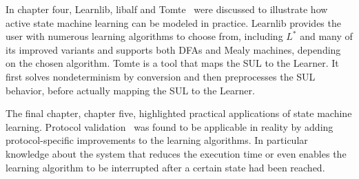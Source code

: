 \documentclass[multi,crop=false,class=article]{standalone}
\begin{document}
In chapter four, Learnlib, libalf and Tomte~\cite{Raffelt2009,Bollig2010,Tomte2014}
were discussed to illustrate how active state machine learning can be modeled in
practice. Learnlib provides the user with numerous learning algorithms to choose
from, including $L^*$ and many of its improved variants and supports both DFAs
and Mealy machines, depending on the chosen algorithm. Tomte is a tool that maps
the SUL to the Learner. It first solves nondeterminism by conversion and then
preprocesses the SUL behavior, before actually mapping the SUL to the Learner.


The final chapter, chapter
five, highlighted practical applications of state machine learning.
Protocol validation~\cite{deRuiter2015} was found to be applicable in reality by
adding protocol-specific improvements to the learning algorithms. In particular
knowledge about the system that reduces the execution time or even enables the
learning algorithm to be interrupted after a certain state had been reached.
\end{document}
